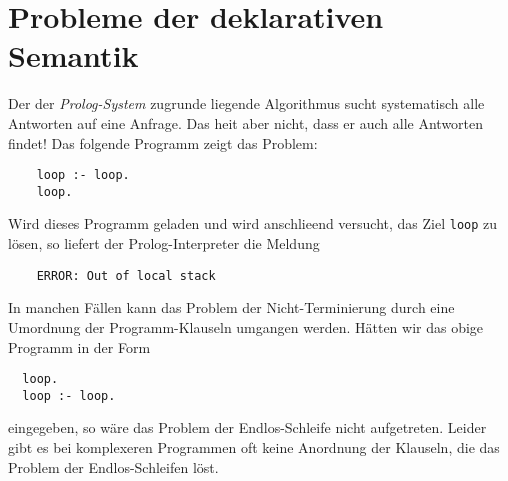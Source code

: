 \section{Probleme der deklarativen Semantik}
Der der \textsl{Prolog-System} zugrunde liegende Algorithmus sucht systematisch alle
Antworten auf eine Anfrage.  Das hei\3t aber nicht,
dass er auch alle Antworten  findet!   Das folgende Programm zeigt das Problem:
\begin{verbatim}
    loop :- loop.
    loop.
\end{verbatim}
Wird dieses Programm geladen und wird anschlie\3end versucht, das Ziel \texttt{loop} zu
l\"{o}sen, so liefert der Prolog-Interpreter die Meldung
\begin{verbatim}
    ERROR: Out of local stack
\end{verbatim}

In manchen F\"{a}llen kann  das Problem der Nicht-Terminierung 
 durch eine Umordnung der Programm-Klauseln umgangen werden.
H\"{a}tten wir das obige Programm in  der Form
\begin{verbatim}
  loop.
  loop :- loop.
\end{verbatim}
eingegeben, so w\"{a}re das Problem der Endlos-Schleife nicht aufgetreten.  Leider gibt es bei
komplexeren Programmen oft keine Anordnung der Klauseln, die das Problem der
Endlos-Schleifen l\"{o}st.  


